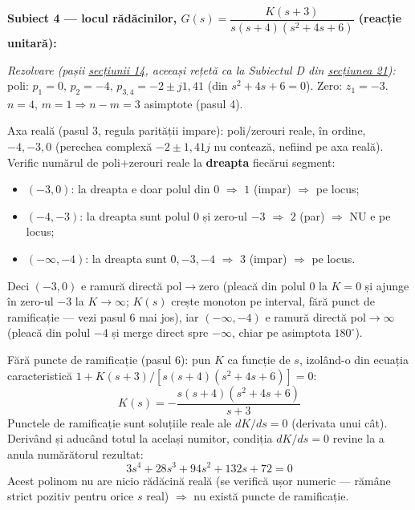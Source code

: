\documentclass[10pt,a4paper]{article}
\begin{document}
\textbf{Subiect 4 — locul rădăcinilor, $G(s)=\dfrac{K(s+3)}{s(s+4)(s^2+4s+6)}$ (reacție unitară):}

\textit{Rezolvare (pașii \hyperref[sec:14]{secțiunii 14}, aceeași rețetă ca la Subiectul D din \hyperref[sec:21]{secțiunea 21}):} poli: $p_1{=}0,\,p_2{=}{-}4,\,p_{3,4}{=}{-}2\pm j1{,}41$ (din $s^2{+}4s{+}6{=}0$). Zero: $z_1{=}{-}3$. $n{=}4,\,m{=}1\Rightarrow n-m=3$ asimptote (pasul 4).

Axa reală (pasul 3, regula parității impare): poli/zerouri reale, în ordine, $-4,-3,0$ (perechea complexă $-2\pm1{,}41j$ nu contează, nefiind pe axa reală). Verific numărul de poli+zerouri reale la \textbf{dreapta} fiecărui segment:
\begin{itemize}
\item $(-3,0)$: la dreapta e doar polul din $0$ $\Rightarrow$ $1$ (impar) $\Rightarrow$ pe locus;
\item $(-4,-3)$: la dreapta sunt polul $0$ și zero-ul $-3$ $\Rightarrow$ $2$ (par) $\Rightarrow$ NU e pe locus;
\item $(-\infty,-4)$: la dreapta sunt $0,-3,-4$ $\Rightarrow$ $3$ (impar) $\Rightarrow$ pe locus.
\end{itemize}
Deci $(-3,0)$ e ramură directă pol$\to$zero (pleacă din polul $0$ la $K{=}0$ și ajunge în zero-ul $-3$ la $K{\to}\infty$; $K(s)$ crește monoton pe interval, fără punct de ramificație — vezi pasul 6 mai jos), iar $(-\infty,-4)$ e ramură directă pol$\to\infty$ (pleacă din polul $-4$ și merge direct spre $-\infty$, chiar pe asimptota $180^\circ$).

Fără puncte de ramificație (pasul 6): pun $K$ ca funcție de $s$, izolând-o din ecuația caracteristică $1+K(s+3)/[s(s+4)(s^2+4s+6)]=0$:
$$K(s)=-\dfrac{s(s+4)(s^2+4s+6)}{s+3}$$
Punctele de ramificație sunt soluțiile reale ale $dK/ds=0$ (derivata unui cât). Derivând și aducând totul la același numitor, condiția $dK/ds{=}0$ revine la a anula numărătorul rezultat:
$$3s^4+28s^3+94s^2+132s+72=0$$
Acest polinom nu are nicio rădăcină reală (se verifică ușor numeric — rămâne strict pozitiv pentru orice $s$ real) $\Rightarrow$ nu există puncte de ramificație.
\end{document}
